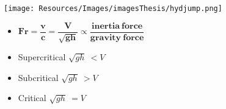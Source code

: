 \begin{frame}
\begin{minipage}{0.4\textwidth}
\begin{itemize}
\end{itemize}
\end{minipage}
\end{frame}

\clearpage


\begin{frame}
\begin{minipage}{0.5\textwidth}
\vspace{1cm}
\texttt{[image: Resources/Images/imagesThesis/hydjump.png]}
\end{minipage}
\hspace{1cm}
\begin{minipage}{0.4\textwidth}
\vspace{1.5cm}
\begin{tcolorbox}[colback=white] 
\begin{itemize}
\setlength{\itemsep}{1cm}
\item[] $\mathbf{Fr = \dfrac{v}{c} =\dfrac{V}{\sqrt{gh}} \propto \dfrac{inertia\ force}{gravity\ force}}$
\item Supercritical $\sqrt{gh}\ < V$
\item Subcritical $\sqrt{gh}\ > V$
\item Critical $\sqrt{gh}\  =  V$
\end{itemize}
\end{tcolorbox}
\end{minipage}
\end{frame}

